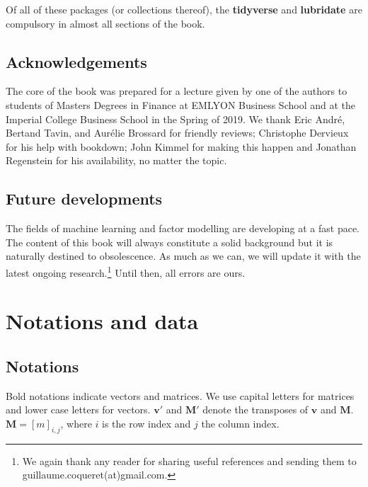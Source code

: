 \documentclass[]{krantz}
\let\rmarkdownfootnote\footnote%
\def\footnote{\protect\rmarkdownfootnote}
\theoremstyle{definition}
\theoremstyle{definition}
\theoremstyle{definition}
\theoremstyle{remark}
\begin{document}
Of all of these packages (or collections thereof), the
\textbf{tidyverse} and \textbf{lubridate} are compulsory in almost all
sections of the book.

\hypertarget{acknowledgements}{%
\section{Acknowledgements}\label{acknowledgements}}

The core of the book was prepared for a lecture given by one of the
authors to students of Masters Degrees in Finance at EMLYON Business
School and at the Imperial College Business School in the Spring of
2019. We thank Eric André, Bertand Tavin, and Aurélie Brossard for
friendly reviews; Christophe Dervieux for his help with bookdown; John
Kimmel for making this happen and Jonathan Regenstein for his
availability, no matter the topic.

\hypertarget{future-developments}{%
\section{Future developments}\label{future-developments}}

The fields of machine learning and factor modelling are developing at a
fast pace. The content of this book will always constitute a solid
background but it is naturally destined to obsolescence. As much as we
can, we will update it with the latest ongoing research.\footnote{We
  again thank any reader for sharing useful references and sending them
  to guillaume.coqueret(at)gmail.com.} Until then, all errors are ours.

\hypertarget{notdata}{%
\chapter{Notations and data}\label{notdata}}

\hypertarget{notations}{%
\section{Notations}\label{notations}}

Bold notations indicate vectors and matrices. We use capital letters for
matrices and lower case letters for vectors. \(\mathbf{v}'\) and
\(\mathbf{M}'\) denote the transposes of \(\mathbf{v}\) and
\(\mathbf{M}\). \(\mathbf{M}=[m]_{i,j}\), where \(i\) is the row index
and \(j\) the column index.
\end{document}
